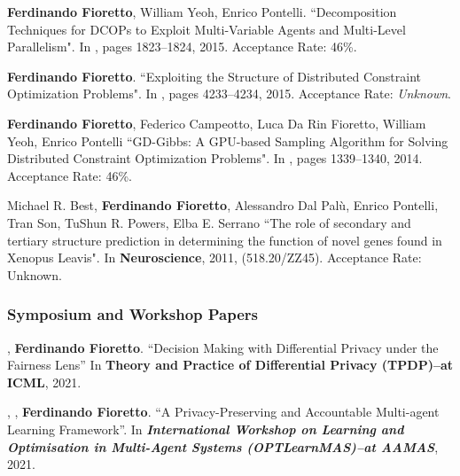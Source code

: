 \item 
	{\bf Ferdinando Fioretto}, William Yeoh, Enrico Pontelli.
	{``Decomposition Techniques for DCOPs to Exploit Multi-Variable Agents and Multi-Level Parallelism"}. %
	In \procAAMAS, pages 1823--1824, 2015.
	Acceptance Rate: 46\%.

\item 
	{\bf Ferdinando Fioretto}. 
	{``Exploiting the Structure of Distributed Constraint Optimization Problems"}. 
	In \procAAAI, pages 4233--4234, 2015.
	Acceptance Rate: {\it Unknown}.

\item 
	{\bf Ferdinando Fioretto}, Federico Campeotto, Luca Da Rin Fioretto, William Yeoh, Enrico Pontelli 
	{``GD-Gibbs: A GPU-based Sampling Algorithm for Solving Distributed Constraint Optimization Problems"}. %
	In \procAAMAS, pages 1339--1340, 2014.
	Acceptance Rate: 46\%.

\item
	Michael R. Best, {\bf Ferdinando Fioretto}, Alessandro Dal Pal\`{u}, Enrico Pontelli, Tran Son, TuShun R. Powers, Elba E. Serrano
	{``The role of secondary and tertiary structure prediction in determining the function of novel genes found in Xenopus Leavis"}.
	In \textbf{Neuroscience}, 2011, (518.20/ZZ45).
	Acceptance Rate: Unknown.
\endEnum



\subsubsection*{\sc Symposium and Workshop Papers} %
\renewcommand{\labelenumi}{w\theenumi.} 
\beginEnum
\item {}, {\bf Ferdinando Fioretto}.
	{``Decision Making with Differential Privacy under the Fairness Lens''}
	In {\bf Theory and Practice of Differential Privacy (TPDP)--at ICML}, 2021.

\item 
	, , {\bf Ferdinando Fioretto}. 
	``A Privacy-Preserving and Accountable Multi-agent Learning Framework''. 
	In \emph{{\bf International Workshop on Learning and Optimisation 
	in Multi-Agent Systems (OPTLearnMAS)--at AAMAS}}, 2021.

